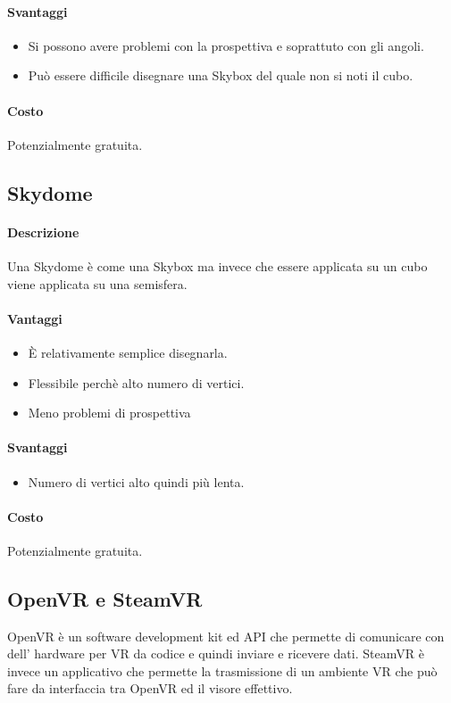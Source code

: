 \documentclass[8pt]{extarticle}
\begin{document}
\begin{multicols}{3}
\paragraph{Svantaggi}
\begin{itemize}
    \item Si possono avere problemi con la prospettiva e soprattuto con gli angoli.
    \item Può essere difficile disegnare una Skybox del quale non si noti il cubo.
\end{itemize}
\paragraph{Costo} Potenzialmente gratuita.
\subsection{Skydome}
\paragraph{Descrizione} 
Una Skydome è come una Skybox ma invece che essere applicata su un cubo viene applicata
su una semisfera.
\paragraph{Vantaggi}
\begin{itemize}
    \item È relativamente semplice disegnarla.
    \item Flessibile perchè alto numero di vertici.
    \item Meno problemi di prospettiva 
\end{itemize}
\paragraph{Svantaggi}
\begin{itemize}
    \item Numero di vertici alto quindi più lenta.
\end{itemize}
\paragraph{Costo} Potenzialmente gratuita.
\subsection{OpenVR e SteamVR}
OpenVR è un software development kit ed API che permette di comunicare con dell'
hardware per VR da codice e quindi inviare e ricevere dati. SteamVR è invece un 
applicativo che permette la trasmissione di un ambiente VR che può fare da interfaccia
tra OpenVR ed il visore effettivo.

\end{multicols}
\end{document}
